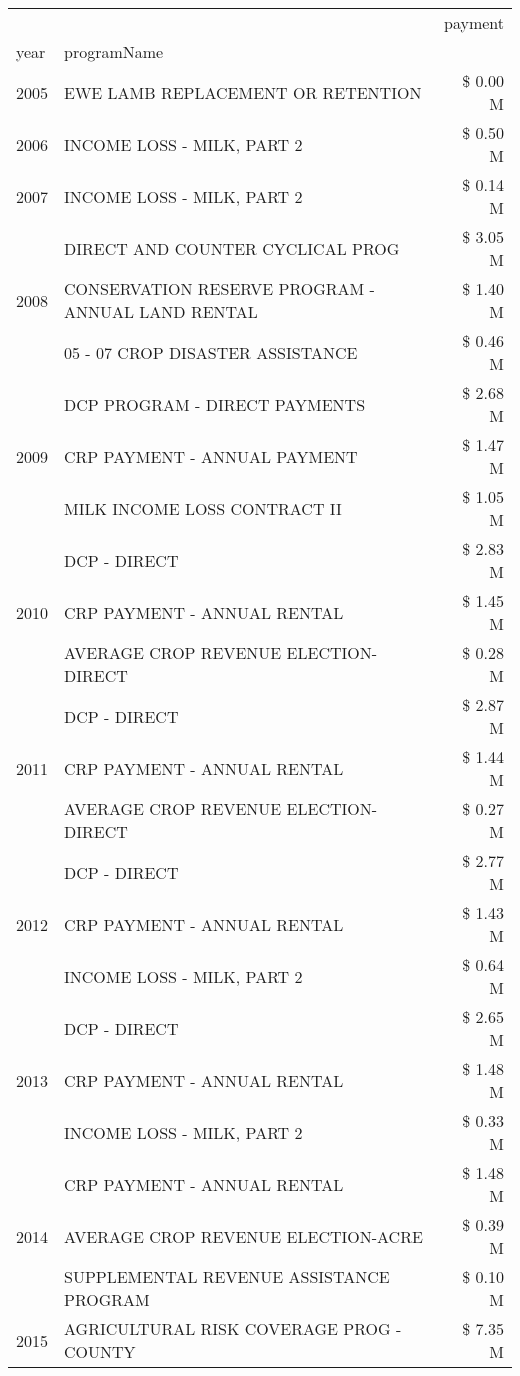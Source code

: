 \begin{tabular}{llr}
\toprule
 &  & payment \\
year & programName &  \\
\midrule
2005 & EWE LAMB REPLACEMENT OR RETENTION & \$ 0.00 M \\
\cline{1-3}
2006 & INCOME LOSS - MILK, PART 2 & \$ 0.50 M \\
\cline{1-3}
2007 & INCOME LOSS - MILK, PART 2 & \$ 0.14 M \\
\cline{1-3}
\multirow[t]{3}{*}{2008} & DIRECT AND COUNTER CYCLICAL PROG & \$ 3.05 M \\
 & CONSERVATION RESERVE PROGRAM - ANNUAL LAND RENTAL & \$ 1.40 M \\
 & 05 - 07 CROP DISASTER ASSISTANCE & \$ 0.46 M \\
\cline{1-3}
\multirow[t]{3}{*}{2009} & DCP PROGRAM - DIRECT PAYMENTS & \$ 2.68 M \\
 & CRP PAYMENT - ANNUAL PAYMENT & \$ 1.47 M \\
 & MILK INCOME LOSS CONTRACT II & \$ 1.05 M \\
\cline{1-3}
\multirow[t]{3}{*}{2010} & DCP - DIRECT & \$ 2.83 M \\
 & CRP PAYMENT - ANNUAL RENTAL & \$ 1.45 M \\
 & AVERAGE CROP REVENUE ELECTION-DIRECT & \$ 0.28 M \\
\cline{1-3}
\multirow[t]{3}{*}{2011} & DCP - DIRECT & \$ 2.87 M \\
 & CRP PAYMENT - ANNUAL RENTAL & \$ 1.44 M \\
 & AVERAGE CROP REVENUE ELECTION-DIRECT & \$ 0.27 M \\
\cline{1-3}
\multirow[t]{3}{*}{2012} & DCP - DIRECT & \$ 2.77 M \\
 & CRP PAYMENT - ANNUAL RENTAL & \$ 1.43 M \\
 & INCOME LOSS - MILK, PART 2 & \$ 0.64 M \\
\cline{1-3}
\multirow[t]{3}{*}{2013} & DCP - DIRECT & \$ 2.65 M \\
 & CRP PAYMENT - ANNUAL RENTAL & \$ 1.48 M \\
 & INCOME LOSS - MILK, PART 2 & \$ 0.33 M \\
\cline{1-3}
\multirow[t]{3}{*}{2014} & CRP PAYMENT - ANNUAL RENTAL & \$ 1.48 M \\
 & AVERAGE CROP REVENUE ELECTION-ACRE & \$ 0.39 M \\
 & SUPPLEMENTAL REVENUE ASSISTANCE PROGRAM & \$ 0.10 M \\
\cline{1-3}
\multirow[t]{3}{*}{2015} & AGRICULTURAL RISK COVERAGE PROG - COUNTY & \$ 7.35 M \\

\end{tabular}
